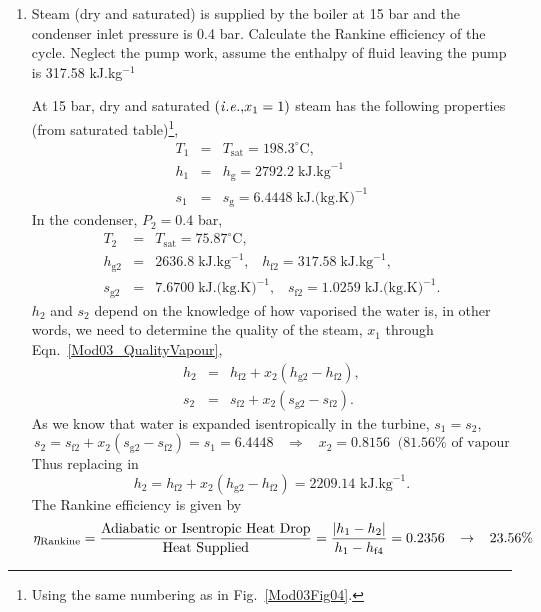 \begin{enumerate}[1)]
\item\label{Mod03Ex06} Steam (dry and saturated) is supplied by the boiler at 15 bar and the condenser inlet pressure is 0.4 bar. Calculate the Rankine efficiency of the cycle. Neglect the pump work, assume the enthalpy of fluid leaving the pump is 317.58 kJ.kg$^{-1}$

     At 15 bar, dry and saturated $\left({\it i.e., } x_{1}=1\right)$ steam has the following properties (from saturated table)\footnote{Using the same numbering as in Fig.~\ref{Mod03Fig04}.},
          \begin{eqnarray}
             T_{1} &=& T_{\text{sat}} = 198.3^{\circ}\text{C},\nonumber \\
             h_{1} &=& h_{\text{g}} = 2792.2\; \text{kJ.kg}^{-1} \nonumber \\
             s_{1} &=& s_{\text{g}} = 6.4448\; \text{kJ.(kg.K)}^{-1} \nonumber
          \end{eqnarray} 
    In the condenser, $P_{2}=0.4$ bar,
          \begin{eqnarray}
              T_{2} &=& T_{\text{sat}} = 75.87^{\circ}\text{C}, \nonumber \\
              h_{\text{g}2} &=& 2636.8\;\text{kJ.kg}^{-1},\;\;\; h_{\text{f}2} = 317.58\;\text{kJ.kg}^{-1},  \nonumber \\
              s_{\text{g}2} &=& 7.6700 \;\text{kJ.(kg.K)}^{-1},\;\;\; s_{\text{f}2} = 1.0259\;\text{kJ.(kg.K)}^{-1}. \nonumber  
          \end{eqnarray}
$h_{2}$ and $s_{2}$ depend on the knowledge of how vaporised the water is, in other words, we need to determine the quality of the steam, $x_{1}$ through Eqn.~\ref{Mod03_QualityVapour},
      \begin{eqnarray}
          h_{2} &=& h_{\text{f}2} + x_{2}\left(h_{\text{g}2} - h_{\text{f}2}\right), \nonumber \\
          s_{2} &=& s_{\text{f}2} + x_{2}\left(s_{\text{g}2} - s_{\text{f}2}\right). \nonumber
      \end{eqnarray}
As we know that water is expanded isentropically in the turbine, \ie $s_{1}=s_{2}$,
      \begin{displaymath}
         s_{2} = s_{\text{f}2} + x_{2}\left(s_{\text{g}2} - s_{\text{f}2}\right) = s_{1} = 6.4448 \;\;\;\Rightarrow \;\;\; x_{2} = 0.8156 \;\;(81.56\% \text{ of vapour}
      \end{displaymath}
Thus replacing in 
      \begin{displaymath}
          h_{2} = h_{\text{f}2} + x_{2}\left(h_{\text{g}2} - h_{\text{f}2}\right) = 2209.14\text{ kJ.kg}^{-1}.
      \end{displaymath}
The Rankine efficiency is given by
      \begin{displaymath}
           \eta_{\text{Rankine}} = \displaystyle\frac{\text{Adiabatic or Isentropic Heat Drop}}{\text{Heat Supplied}} = \displaystyle\frac{\left|h_{1}-h_{2}\right|}{h_{1}-h_{\text{f}4}} = 0.2356\;\;\;\rightarrow \;\;\; 23.56\%
      \end{displaymath}
    


\end{enumerate}



